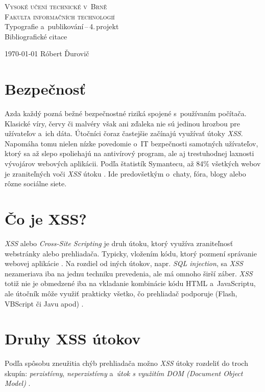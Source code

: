 \documentclass[a4paper,11pt, titlepage]{article}
\begin{document}
\begin{titlepage}

\begin{center}
    {\Huge\textsc{Vysoké učení technické v~Brně}}\\
        \medskip
    {\huge\textsc{Fakulta informačních technologií}}\\
    {\LARGE Typografie a~publikování\,--\,4.\,projekt}\\
        \medskip
    {\huge Bibliografické citace}\\
\end{center}

{\LARGE \today \hfill
Róbert Ďurovič}

\end{titlepage}

\section{Bezpečnosť}
Azda každý pozná bežné bezpečnostné riziká spojené s~používaním počítača. Klasické víry, červy či malvéry však ani zďaleka nie sú jedinou hrozbou pre užívateľov a~ich dáta. Útočníci čoraz častejšie začínajú využívať útoky \emph{XSS}. Napomáha tomu nielen nízke povedomie o~IT bezpečnosti samotných užívateľov, ktorý sa až slepo spoliehajú na antivírový program, ale aj trestuhodnej laxnosti vývojárov webových aplikácii. Podľa štatistík Symantecu, až 84\% všetkých webov je zraniteľných voči \emph{XSS} útoku \cite{Secpoint:XSS}. Ide predovšetkým o~chaty, fóra, blogy alebo rôzne sociálne siete.

\section{Čo je XSS?}
\emph{XSS} alebo \emph{Cross-Site Scripting} je druh útoku, ktorý využíva zraniteľnosť webstránky alebo prehliadača. Typicky, vložením kódu, ktorý pozmení správanie webovej aplikácie \cite{Excess:XSS}. Na rozdiel od iných útokov, napr. \emph{SQL injection}, sa \emph{XSS} nezameriava iba na jednu techniku prevedenia, ale má omnoho širší záber. \emph{XSS} totiž nie je obmedzené iba na vkladanie kombinácie kódu HTML a~JavaScriptu, ale útočník môže využiť prakticky všetko, čo prehliadač podporuje (Flash, VBScript či Javu apod) \cite{Zbornik:Bezpecnost_webovych_informacnych_systemov}.

\section{Druhy XSS útokov}
Podľa spôsobu zneužitia chýb prehliadača možno \emph{XSS} útoky rozdeliť do troch skupín: \emph{perzistívny}, \emph{neperzistívny} a~\emph{útok s využitím DOM (Document Object Model)} \cite{OWASP:Types_of_XSS}.
\end{document}
